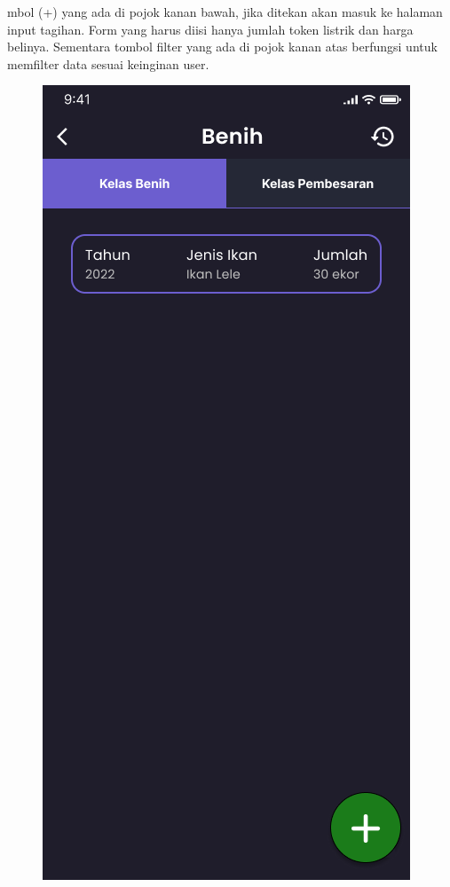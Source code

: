 \begin{enumerate}
\begin{enumerate}
mbol (+) yang ada di pojok kanan bawah, jika ditekan akan masuk ke halaman input tagihan. Form yang harus diisi hanya jumlah token listrik dan harga belinya. Sementara tombol filter yang ada di pojok kanan atas berfungsi untuk memfilter data sesuai keinginan user.

		\begin{figure}[H]
			  \includegraphics[width=\linewidth]{gambar/sprint1/mockup_detail_seed.png}

\end{figure}
\end{enumerate}
\end{enumerate}
